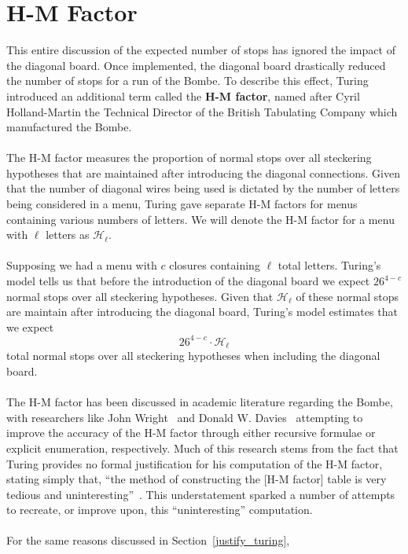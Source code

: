 \section{H-M Factor}
This entire discussion of the expected number of stops has ignored
the impact of the diagonal board. Once implemented, the diagonal
board drastically reduced the number of stops for a run of the Bombe.
To describe this effect, Turing introduced an additional term called
the {\bf{H-M factor}}, named after Cyril Holland-Martin the Technical
Director of the British Tabulating Company which manufactured the Bombe.
\\\\The H-M factor measures the proportion of normal stops over all
steckering hypotheses that are maintained after introducing the
diagonal connections. Given that the number of diagonal wires being
used is dictated by the number of letters being considered in a menu,
Turing gave separate H-M factors for menus containing various numbers
of letters. We will denote the H-M factor for a menu with $\ell$ letters
as $\mathcal{H}_\ell$.
\\\\Supposing we had a menu with $c$ closures containing $\ell$ total
letters. Turing's model tells us that before the introduction of the
diagonal board we expect $26^{4-c}$ normal stops over all steckering
hypotheses. Given that $\mathcal{H}_\ell$ of these normal stops are
maintain after introducing the diagonal board, Turing's model
estimates that we expect
\[
  26^{4-c}\cdot\mathcal{H}_\ell
\]
total normal stops over all steckering hypotheses when including the
diagonal board.
\\\\The H-M factor has been discussed in academic literature
regarding the Bombe, with researchers like John Wright~\cite{Wright2015} and Donald W. Davies~\cite{Davies2010} attempting to improve the accuracy of the H-M factor through
either recursive formulae or explicit enumeration, respectively. Much
of this research stems from the fact that Turing provides no formal
justification for his computation of the H-M factor, stating simply
that, ``the method of constructing the [H-M factor] table is very
tedious and uninteresting''~\cite[p.~116]{Turing1940ProfBook}. This understatement sparked a number of
attempts to recreate, or improve upon, this ``uninteresting'' computation.
\\\\For the same reasons discussed in Section~\ref{justify_turing},

